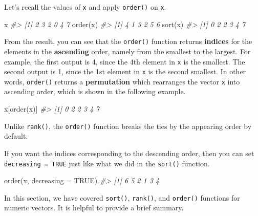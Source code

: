 \documentclass[
]{book}
\newenvironment{Shaded}{\begin{snugshade}}{\end{snugshade}}
\newcommand{\AttributeTok}[1]{\textcolor[rgb]{0.77,0.63,0.00}{#1}}
\newcommand{\CommentTok}[1]{\textcolor[rgb]{0.56,0.35,0.01}{\textit{#1}}}
\newcommand{\ConstantTok}[1]{\textcolor[rgb]{0.00,0.00,0.00}{#1}}
\newcommand{\FunctionTok}[1]{\textcolor[rgb]{0.00,0.00,0.00}{#1}}
\newcommand{\NormalTok}[1]{#1}
\newenvironment{blackbox}{
  \definecolor{shadecolor}{rgb}{0, 0, 0}  %
  \color{white}
  \begin{shaded}}
 {\end{shaded}}
\newenvironment{infobox}[1]
  {
  \begin{itemize}
  \renewcommand{\labelitemi}{
    \raisebox{-.7\height}[0pt][0pt]{
      {\setkeys{Gin}{width=3em,keepaspectratio}
        \texttt{[image: pics/\#1]}}
    }
  }
  \setlength{\fboxsep}{1em}
  \begin{blackbox}
  \item
  }
  {
  \end{blackbox}
  \end{itemize}
  }
\begin{document}
Let's recall the values of \texttt{x} and apply \texttt{order()} on \texttt{x}.

\begin{Shaded}
\begin{Highlighting}[]
\NormalTok{x}
\CommentTok{\#\textgreater{} [1] 2 3 2 0 4 7}
\FunctionTok{order}\NormalTok{(x)}
\CommentTok{\#\textgreater{} [1] 4 1 3 2 5 6}
\FunctionTok{sort}\NormalTok{(x)}
\CommentTok{\#\textgreater{} [1] 0 2 2 3 4 7}
\end{Highlighting}
\end{Shaded}

From the result, you can see that the \texttt{order()} function returns \textbf{indices} for the elements in the \textbf{ascending} order, namely from the smallest to the largest. For example, the first output is 4, since the 4th element in \texttt{x} is the smallest. The second output is 1, since the 1st element in \texttt{x} is the second smallest. In other words, \texttt{order()} returns a \textbf{permutation} which rearranges the vector \texttt{x} into ascending order, which is shown in the following example.

\begin{Shaded}
\begin{Highlighting}[]
\NormalTok{x[}\FunctionTok{order}\NormalTok{(x)]}
\CommentTok{\#\textgreater{} [1] 0 2 2 3 4 7}
\end{Highlighting}
\end{Shaded}

\begin{infobox}{caution}
Unlike \texttt{rank()}, the \texttt{order()} function breaks the ties by the appearing order by default.

\end{infobox}

If you want the indices corresponding to the descending order, then you can set \texttt{decreasing\ =\ TRUE} just like what we did in the \texttt{sort()} function.

\begin{Shaded}
\begin{Highlighting}[]
\FunctionTok{order}\NormalTok{(x, }\AttributeTok{decreasing =} \ConstantTok{TRUE}\NormalTok{)  }
\CommentTok{\#\textgreater{} [1] 6 5 2 1 3 4}
\end{Highlighting}
\end{Shaded}

In this section, we have covered \texttt{sort()}, \texttt{rank()}, and \texttt{order()} functions for numeric vectors. It is helpful to provide a brief summary.
\end{document}
